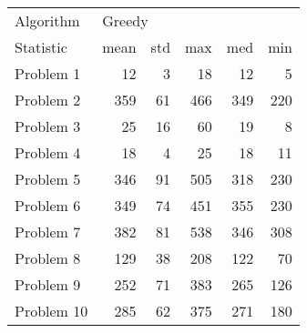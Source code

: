 \begin{tabular}{lrrrrr}
\toprule
Algorithm & \multicolumn{5}{l}{Greedy} \\
Statistic &   mean & std &  max &  med &  min \\
\midrule
Problem 1  &     12 &   3 &   18 &   12 &    5 \\
Problem 2  &    359 &  61 &  466 &  349 &  220 \\
Problem 3  &     25 &  16 &   60 &   19 &    8 \\
Problem 4  &     18 &   4 &   25 &   18 &   11 \\
Problem 5  &    346 &  91 &  505 &  318 &  230 \\
Problem 6  &    349 &  74 &  451 &  355 &  230 \\
Problem 7  &    382 &  81 &  538 &  346 &  308 \\
Problem 8  &    129 &  38 &  208 &  122 &   70 \\
Problem 9  &    252 &  71 &  383 &  265 &  126 \\
Problem 10 &    285 &  62 &  375 &  271 &  180 \\
\bottomrule
\end{tabular}
